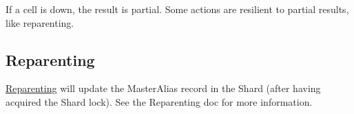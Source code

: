 If a cell is down, the result is partial. Some actions are resilient to partial results, like reparenting.

\subsection{Reparenting}\hypertarget{reparenting}{}\label{reparenting}

\href{Reparenting.markdown}{Reparenting} will update the MasterAlias record in the Shard (after having acquired the Shard lock). See the Reparenting doc for more information.

